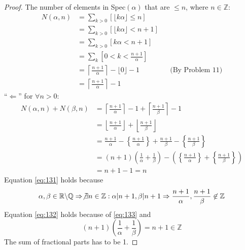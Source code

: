 \documentclass[a4paper,12pt]{article}
\theoremstyle{definition}
\newenvironment{problems}{\begin{list}{}{\renewcommand{\makelabel}[1]{\textbf{##1}\hfil}}}{\end{list}}
\begin{document}
\begin{problems}
\begin{proof}
        The number of elements in Spec$(\alpha)$ that are $\leq n$, where $n\in\mathbb{Z}$:
        \begin{align*}
            N(\alpha,n) &= \sum_{k>0}[\lfloor k\alpha \rfloor \leq n]\\
            &= \sum_{k>0}[\lfloor k\alpha \rfloor < n+1]\\
            &= \sum_{k>0}[k\alpha < n+1] 
            \\
            &=\sum_k[0<k<\frac{n+1}{\alpha}]\\
            &=\left\lceil \frac{n+1}{\alpha}\right\rceil -\lfloor 0\rfloor - 1 && \text{(By Problem 11)}\\
            &=\left\lceil \frac{n+1}{\alpha}\right\rceil- 1
        \end{align*}
        ``$\Leftarrow$'' for $\forall n > 0$:
        \begin{align}
            N(\alpha,n)+N(\beta, n) &= \left\lceil \frac{n+1}{\alpha}\right\rceil- 1 + \left\lceil \frac{n+1}{\beta}\right\rceil- 1\nonumber\\
            &= \left\lfloor \frac{n+1}{\alpha}\right\rfloor + \left\lfloor \frac{n+1}{\beta}\right\rfloor \label{eq:131}\\
            &= \frac{n+1}{\alpha} - \left\{ \frac{n+1}{\alpha}\right\} + \frac{n+1}{\beta} - \left\{ \frac{n+1}{\beta}\right\}\nonumber\\
            &= (n+1)\left(\frac{1}{\alpha}+\frac{1}{\beta}\right) - \left(\left\{ \frac{n+1}{\alpha}\right\} + \left\{ \frac{n+1}{\beta}\right\}\right) \label{eq:132}\\
            &= n+1 - 1 = n\nonumber
        \end{align}
        Equation \eqref{eq:131} holds because 
        \begin{equation}\label{eq:133}
            \alpha,\beta\in\mathbb{R}\backslash \mathbb{Q}\Rightarrow \not\exists n\in\mathbb{Z}:\alpha|n+1,\beta|n+1\Rightarrow \frac{n+1}{\alpha},\frac{n+1}{\beta}\not\in\mathbb{Z}
        \end{equation}
        Equation \eqref{eq:132} holds because of \eqref{eq:133} and 
        \begin{equation}
            (n+1)\left(\frac{1}{\alpha}+\frac{1}{\beta}\right) = n+1\in \mathbb{Z}
        \end{equation}
        The sum of fractional parts has to be 1.


\end{proof}
\end{problems}
\end{document}
